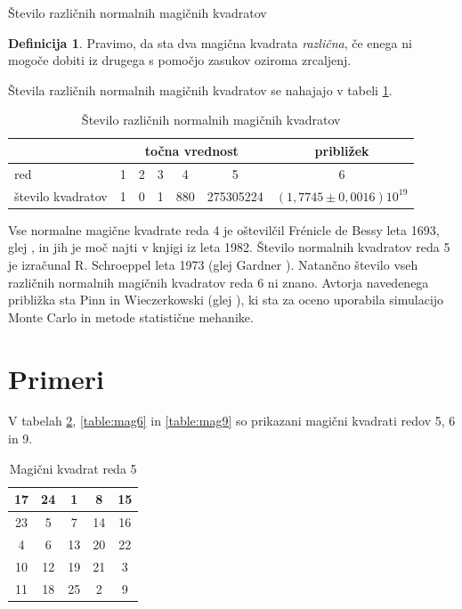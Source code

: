 \documentclass[a4paper,12pt]{article}
\theoremstyle{definition}
\newtheorem{definicija}{Definicija}
\theoremstyle{plain}
\newcommand{\pojem}[1]{\emph{\color{purple}#1}}
\newenvironment{magic}[3]{
   \begin{table}[!ht]
   \centering
   \caption{#2}
   \label{#3}
   \large
   \begin{tabular}{|*{#1}{c|}} \hline
}{
 \end{tabular}
   \normalsize
\end{table}  
}
\begin{document}
Število različnih normalnih magičnih kvadratov

\begin{definicija}
      Pravimo, da sta dva magična kvadrata \pojem{različna}, če enega ni mogoče dobiti
      iz drugega s pomočjo zasukov oziroma zrcaljenj.
\end{definicija}

Števila različnih normalnih magičnih kvadratov se nahajajo v tabeli \ref{table:stevilka}.

\begin{table}
   \centering
   \caption{Število različnih normalnih magičnih kvadratov}
\begin{tabular}{lcccccc} \toprule
      & \multicolumn{5}{c}{točna vrednost} & približek \\   \midrule
      red & 1 & 2 & 3 & 4 & 5 & 6 \\    
      število kvadratov & 1 & 0 & 1 & 880 & 275305224 & $(1,7745 \pm 0,0016)10^{19}$ \\ \bottomrule
\end{tabular}
\label{table:stevilka}
\end{table}

Vse normalne magične kvadrate reda 4 je oštevilčil Frénicle de Bessy
leta 1693, glej \cite{bessy}, in jih je moč najti v knjigi \cite{berlekamp}
iz leta 1982. Število normalnih kvadratov reda 5 je izračunal
R. Schroeppel leta 1973 (glej Gardner \cite{gardner}).
Natančno število vseh različnih normalnih magičnih kvadratov reda 6 ni znano.
Avtorja navedenega približka sta Pinn in Wieczerkowski (glej \cite{pinn}), ki
sta za oceno uporabila simulacijo Monte Carlo in metode statistične mehanike.


\section{Primeri}

V tabelah \ref{table:mag5}, \ref{table:mag6} in \ref{table:mag9} so prikazani
magični kvadrati redov 5, 6 in 9.


\begin{magic}{5}{Magični kvadrat reda 5}{table:mag5}
      17 & 24 &  1 &  8 & 15 \\\hline
      23 &  5 &  7 & 14 & 16 \\\hline
       4 &  6 & 13 & 20 & 22 \\\hline
      10 & 12 & 19 & 21 &  3 \\\hline
      11 & 18 & 25 &  2 &  9 \\\hline
\end{magic}
\end{document}
